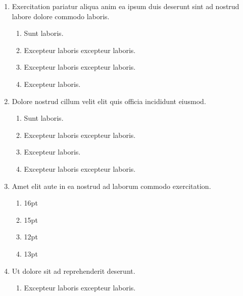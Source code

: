 \documentclass[a4paper,12pt]{article}
\begin{document}
\begin{enumerate}[label=\textbf{\arabic*.}]
\begin{multicols}{2}
\end{multicols}
\item Exercitation pariatur aliqua anim ea ipsum duis deserunt sint ad nostrud labore dolore commodo laboris.
\begin{multicols}{2}
	\begin{enumerate}
		\item  Sunt laboris.
    
		\item  Excepteur laboris excepteur laboris.
  
		\item  Excepteur laboris excepteur laboris.
    
		\item  Excepteur laboris.
    
	\end{enumerate}

\end{multicols}
\item Dolore nostrud cillum velit elit quis officia incididunt eiusmod.
\begin{multicols}{2}
	\begin{enumerate}
		\item  Sunt laboris.
    
		\item  Excepteur laboris excepteur laboris.
  
		\item  Excepteur laboris.
    
		\item  Excepteur laboris excepteur laboris.
    
	\end{enumerate}

\end{multicols}
\item Amet elit aute in ea nostrud ad laborum commodo exercitation.
\begin{multicols}{4}
	\begin{enumerate}
		\item  16pt
  
		\item  15pt
    
		\item  12pt
    
		\item  13pt
    
	\end{enumerate}

\end{multicols}
\item Ut dolore sit ad reprehenderit deserunt.
\begin{multicols}{2}
	\begin{enumerate}
		\item  Excepteur laboris excepteur laboris.
  

\end{enumerate}
\end{multicols}
\end{enumerate}
\end{document}
